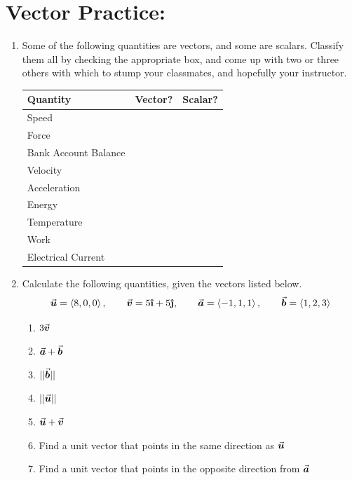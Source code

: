 \section*{Vector Practice:}


\begin{enumerate}
\item Some of the following quantities are vectors, and some are scalars. Classify them all by checking the appropriate box, and come up with two or three others with which to stump your classmates, and hopefully your instructor.
\begin{center}
\large
\begin{tabular}{|l|c|c|}
\hline
\textbf{Quantity}&\textbf{Vector?}&\textbf{Scalar?}\\ \hline
Speed&&\\ \hline
Force&&\\ \hline
Bank Account Balance&& \\ \hline
Velocity &&\\ \hline
Acceleration&& \\ \hline
Energy &&\\ \hline
Temperature&& \\ \hline
Work &&\\ \hline
Electrical Current &&\\ \hline
\end{tabular}
\end{center}
\vfill

\item Calculate the following quantities, given the vectors listed below.
\label{lastpage}
\[
\u=\<8,0,0\>, \qquad \v = 5\ihat+5\jhat, \qquad\a=\<-1,1,1\>, \qquad\b=\<1,2,3\>
\]
\begin{enumerate}
\item \(3\v\)
\item \(\a+\b\)
\item \(||\b||\)
\item \(||\u||\)
\item \(\u+\v\)
\item Find a unit vector that points in the same direction as \(\u\)
\item Find a unit vector that points in the opposite direction from \(\a\)
\end{enumerate}
\end{enumerate}




